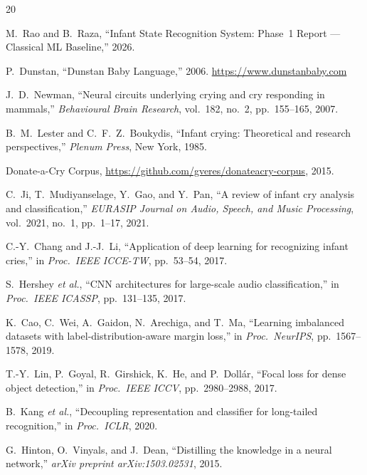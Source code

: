 \documentclass[11pt,a4paper]{article}
\begin{document}

\begin{thebibliography}{20}

M.~Rao and B.~Raza,
``Infant State Recognition System: Phase~1 Report --- Classical ML
Baseline,'' 2026.

P.~Dunstan,
``Dunstan Baby Language,'' 2006.
\url{https://www.dunstanbaby.com}

J.~D.~Newman,
``Neural circuits underlying crying and cry responding in mammals,''
\textit{Behavioural Brain Research}, vol.~182, no.~2, pp.~155--165, 2007.

B.~M.~Lester and C.~F.~Z.~Boukydis,
``Infant crying: Theoretical and research perspectives,''
\textit{Plenum Press}, New York, 1985.

Donate-a-Cry Corpus,
\url{https://github.com/gveres/donateacry-corpus}, 2015.

C.~Ji, T.~Mudiyanselage, Y.~Gao, and Y.~Pan,
``A review of infant cry analysis and classification,''
\textit{EURASIP Journal on Audio, Speech, and Music Processing},
vol.~2021, no.~1, pp.~1--17, 2021.

C.-Y.~Chang and J.-J.~Li,
``Application of deep learning for recognizing infant cries,''
in \textit{Proc.\ IEEE ICCE-TW}, pp.~53--54, 2017.

S.~Hershey \textit{et al.},
``CNN architectures for large-scale audio classification,''
in \textit{Proc.\ IEEE ICASSP}, pp.~131--135, 2017.

K.~Cao, C.~Wei, A.~Gaidon, N.~Arechiga, and T.~Ma,
``Learning imbalanced datasets with label-distribution-aware margin
loss,''
in \textit{Proc.\ NeurIPS}, pp.~1567--1578, 2019.

T.-Y.~Lin, P.~Goyal, R.~Girshick, K.~He, and P.~Doll\'{a}r,
``Focal loss for dense object detection,''
in \textit{Proc.\ IEEE ICCV}, pp.~2980--2988, 2017.

B.~Kang \textit{et al.},
``Decoupling representation and classifier for long-tailed
recognition,''
in \textit{Proc.\ ICLR}, 2020.

G.~Hinton, O.~Vinyals, and J.~Dean,
``Distilling the knowledge in a neural network,''
\textit{arXiv preprint arXiv:1503.02531}, 2015.


\end{thebibliography}
\end{document}
